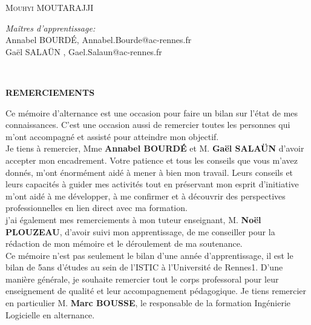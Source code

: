 \documentclass[12pt]{article}
\begin{document}
\begin{titlepage}
	\centering   %
	\textsc{ Mouhyi MOUTARAJJI}\\
		\begin{flushleft} \large
		    \emph{Maîtres d'apprentissage:} \\
		    Annabel BOURDÉ, Annabel.Bourde@ac-rennes.fr\\
			Gaël SALAÜN , Gael.Salaun@ac-rennes.fr\\
			
			
		\end{flushleft}
	
\end{titlepage}


\newpage

\tableofcontents

\newpage

\listoffigures
~
\newpage
\begin{center}
\bfseries {REMERCIEMENTS}
\end{center}


Ce mémoire d'alternance est  une occasion pour faire un bilan sur l'état de mes connaissances. C'est une occasion aussi de remercier toutes les personnes qui m'ont accompagné et assisté pour atteindre mon objectif.\\


Je tiens à remercier, Mme \textbf{Annabel BOURDÉ} et M. \textbf{Gaël SALAÜN} d'avoir accepter mon encadrement. Votre patience et tous les conseils que vous m'avez donnés, m'ont énormément aidé à mener à bien mon travail. Leurs conseils et leurs capacités à guider mes activités tout en préservant mon esprit d'initiative m'ont aidé à me développer, à me confirmer et à découvrir des perspectives professionnelles en lien direct avec ma formation.\\ 


j'ai également mes remerciements à mon tuteur enseignant, M. \textbf{Noël PLOUZEAU},  d'avoir suivi mon apprentissage, de me conseiller pour la rédaction de mon mémoire et le déroulement de ma soutenance. \\

Ce mémoire n'est pas seulement le bilan d'une année d'apprentissage, il est le bilan de 5ans d'études au sein de l'ISTIC à l'Université de Rennes1. D'une manière générale, je souhaite remercier tout le corps professoral pour leur enseignement de qualité et leur accompagnement pédagogique. Je tiens remercier en particulier M. \textbf{Marc BOUSSE}, le responsable de la formation Ingénierie Logicielle en alternance. \\
\end{document}
